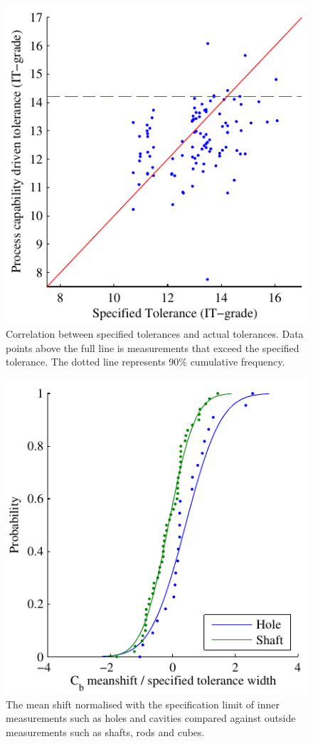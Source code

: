 \documentclass[aip,amsmath, reprint, author-year]{revtex4-1}
\begin{document}
\begin{figure}
\includegraphics{ITG_ITGSpec.pdf}
\caption{\label{fig:ITG_ITGSpec} Correlation between specified tolerances and actual tolerances. 
Data points above the full line is measurements that exceed the specified tolerance. 
The dotted line represents 90\% cumulative frequency.}
\end{figure}

\begin{figure}
\includegraphics{Cb_holeshaft.pdf}
\caption{\label{fig:Cb_holeshaft} The mean shift normalised with the specification limit of inner measurements such as holes and cavities compared against outside measurements such as shafts, rods and cubes. }
\end{figure}
\end{document}
